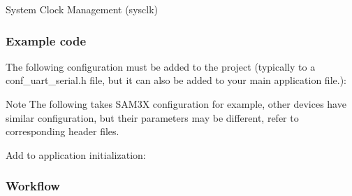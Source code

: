\begin{DoxyEnumerate}
\item System Clock Management (sysclk)
\end{DoxyEnumerate}\hypertarget{serial_use_case_1_serial_use_case_1_setup_code}{}\subsubsection{Example code}\label{serial_use_case_1_serial_use_case_1_setup_code}
The following configuration must be added to the project (typically to a conf\+\_\+uart\+\_\+serial.\+h file, but it can also be added to your main application file.)\+:

\begin{DoxyNote}{Note}
The following takes S\+A\+M3X configuration for example, other devices have similar configuration, but their parameters may be different, refer to corresponding header files.
\end{DoxyNote}

\begin{DoxyCode}{0}
\DoxyCodeLine{\textcolor{preprocessor}{\#define USART\_SERIAL                     \&USARTD0}}
\DoxyCodeLine{\textcolor{preprocessor}{\#define USART\_SERIAL\_BAUDRATE            9600}}
\DoxyCodeLine{\textcolor{preprocessor}{\#define USART\_SERIAL\_CHAR\_LENGTH         US\_MR\_CHRL\_8\_BIT}}
\DoxyCodeLine{\textcolor{preprocessor}{\#define USART\_SERIAL\_PARITY              US\_MR\_PAR\_NO}}
\DoxyCodeLine{\textcolor{preprocessor}{\#define USART\_SERIAL\_STOP\_BIT            false}}
\end{DoxyCode}


Add to application initialization\+: 
\begin{DoxyCode}{0}
\DoxyCodeLine{}
\DoxyCodeLine{\};}
\DoxyCodeLine{}
\end{DoxyCode}
\hypertarget{serial_use_case_1_serial_use_case_1_setup_flow}{}\subsubsection{Workflow}\label{serial_use_case_1_serial_use_case_1_setup_flow}

